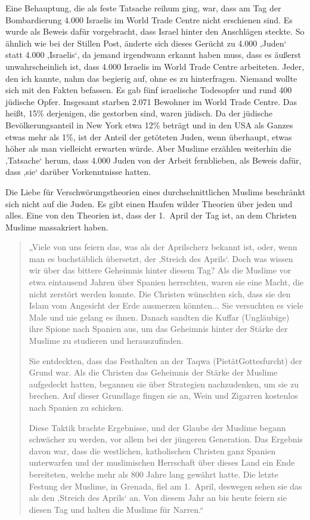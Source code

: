 \documentclass[12pt]{memoir}
\def\/{\discretionary{/}{}{/}}
\begin{document}
Eine Behauptung, die als feste Tatsache reihum ging, war,
dass am Tag der Bombardierung 4.000 Israelis
im World Trade Centre nicht erschienen sind.
Es wurde als Beweis dafür vorgebracht,
dass Israel hinter den Anschlägen steckte.
So ähnlich wie bei der Stillen Post,
änderte sich dieses Gerücht zu 4.000 ‚Juden‘ statt 4.000 ‚Israelis‘,
da jemand irgendwann erkannt haben muss,
dass es äußerst unwahrscheinlich ist,
dass 4.000 Israelis im World Trade Centre arbeiteten.
Jeder, den ich kannte, nahm das begierig auf, ohne es zu hinterfragen.
Niemand wollte sich mit den Fakten befassen.
Es gab fünf israelische Todesopfer und rund 400 jüdische Opfer.
Insgesamt starben 2.071 Bewohner im World Trade Centre.
Das heißt, 15\% derjenigen, die gestorben sind, waren jüdisch.
Da der jüdische Bevölkerungsanteil in New York etwa 12\% beträgt
und in den USA als Ganzes etwas mehr als 1\%,
ist der Anteil der getöteten Juden, wenn überhaupt,
etwas höher als man vielleicht erwarten würde.
Aber Muslime erzählen weiterhin die ‚Tatsache‘ herum,
dass 4.000 Juden von der Arbeit fernblieben,
als Beweis dafür, dass ‚sie‘ darüber Vorkenntnisse hatten.

Die Liebe für Verschwörungstheorien eines durchschnittlichen Muslims
beschränkt sich nicht auf die Juden.
Es gibt einen Haufen wilder Theorien über jeden und alles.
Eine von den Theorien ist, dass der 1.\ April der Tag ist,
an dem Christen Muslime massakriert haben.

\begin{quote}
„Viele von uns feiern das, was als der Aprilscherz bekannt ist, oder,
wenn man es buchstäblich übersetzt, der ‚Streich des Aprils‘.
Doch was wissen wir über das bittere Geheimnis hinter diesem Tag?
Als die Muslime vor etwa eintausend Jahren über Spanien herrschten,
waren sie eine Macht, die nicht zerstört werden konnte.
Die Christen wünschten sich, dass sie den Islam
vom Angesicht der Erde ausmerzen könnten...
Sie versuchten es viele Male und nie gelang es ihnen.
Danach sandten die Kuffar (Ungläubige) ihre Spione nach Spanien aus,
um das Geheimnis hinter der Stärke der Muslime zu studieren und herauszufinden.

Sie entdeckten, dass das Festhalten an der Taqwa
(Pietät\/Gottesfurcht) der Grund war.
Als die Christen das Geheimnis der Stärke der Muslime aufgedeckt hatten,
begannen sie über Strategien nachzudenken, um sie zu brechen.
Auf dieser Grundlage fingen sie an,
Wein und Zigarren kostenlos nach Spanien zu schicken.

Diese Taktik brachte Ergebnisse,
und der Glaube der Muslime begann schwächer zu werden,
vor allem bei der jüngeren Generation.
Das Ergebnis davon war, dass die westlichen, katholischen Christen
ganz Spanien unterwarfen und der muslimischen Herrschaft
über dieses Land ein Ende bereiteten,
welche mehr als 800 Jahre lang gewährt hatte.
Die letzte Festung der Muslime, in Grenada, fiel am 1.\ April,
deswegen sehen sie das als den ‚Streich des Aprils‘ an.
Von diesem Jahr an bis heute feiern sie diesen Tag
und halten die Muslime für Narren.“
\end{quote}
\end{document}
